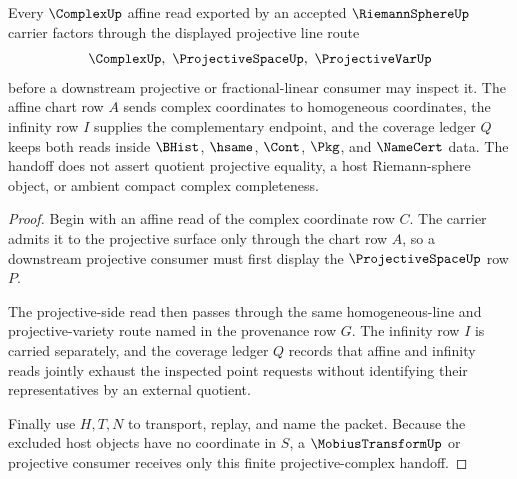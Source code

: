 \begin{theorem}
\label{thm:riemann-sphere-projective-complex-handoff}
Every $\ComplexUp$ affine read exported by an accepted $\RiemannSphereUp$ carrier factors through the displayed projective line route
$$
\ComplexUp,\ \ProjectiveSpaceUp,\ \ProjectiveVarUp
$$
before a downstream projective or fractional-linear consumer may inspect it. The affine chart row $A$ sends complex coordinates to homogeneous coordinates, the infinity row $I$ supplies the complementary endpoint, and the coverage ledger $Q$ keeps both reads inside $\BHist$, $\hsame$, $\Cont$, $\Pkg$, and $\NameCert$ data. The handoff does not assert quotient projective equality, a host Riemann-sphere object, or ambient compact complex completeness.
\end{theorem}
\begin{proof}
Begin with an affine read of the complex coordinate row $C$. The carrier admits it to the projective surface only through the chart row $A$, so a downstream projective consumer must first display the $\ProjectiveSpaceUp$ row $P$.

The projective-side read then passes through the same homogeneous-line and projective-variety route named in the provenance row $G$. The infinity row $I$ is carried separately, and the coverage ledger $Q$ records that affine and infinity reads jointly exhaust the inspected point requests without identifying their representatives by an external quotient.

Finally use $H,T,N$ to transport, replay, and name the packet. Because the excluded host objects have no coordinate in $S$, a $\MobiusTransformUp$ or projective consumer receives only this finite projective-complex handoff.
\end{proof}



